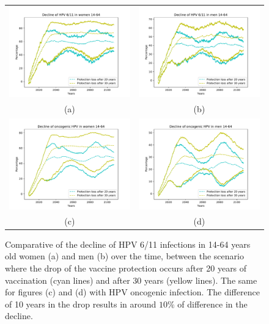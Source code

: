 \begin{figure}[!]
	\centering
	\begin{tabular}{cc}
		\includegraphics[width=0.5\linewidth]{IMGs/7.-Compara_caida/verr_muj.pdf}	& 
		\includegraphics[width=0.5\linewidth]{IMGs/7.-Compara_caida/verr_hom.pdf}  \\ 
		(a)	& (b) \\ 
		\includegraphics[width=0.5\linewidth]{IMGs/7.-Compara_caida/onco_muj.pdf}	& 
		\includegraphics[width=0.5\linewidth]{IMGs/7.-Compara_caida/onco_hom.pdf}  \\ 
		(c)	& (d) \\ 
	\end{tabular} 
	\caption{Comparative of the decline of HPV 6/11 infections in 14-64 years old women (a) and men (b) over the time, between the scenario where the drop of the vaccine protection occurs after 20 years of vaccination (cyan lines) and after 30 years (yellow lines). The same for figures (c) and (d) with HPV oncogenic infection. The difference of 10 years in the drop results in around $10\%$ of difference in the decline.}
	\label{fig:compara_caida}
\end{figure}

